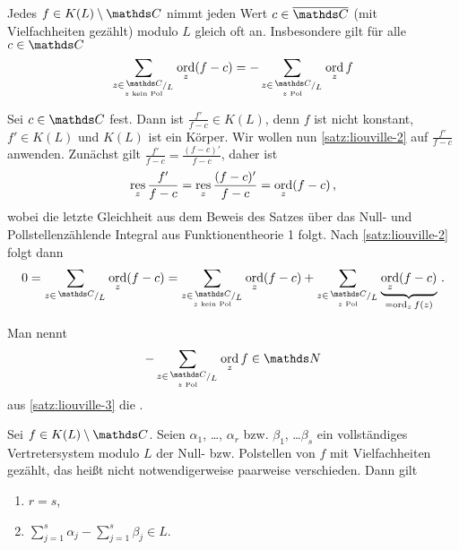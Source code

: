 \begin{satz}\label{satz:liouville-3}
Jedes $f \in K(L)\setminus\CC$ nimmt jeden Wert $c\in\closure\CC$ (mit Vielfachheiten gezählt) modulo $L$ gleich oft an.
Insbesondere gilt für alle $c\in\CC$
\[
	\sum_{\substack{z\in\modulo{\CC}{L}\\ \scriptscriptstyle z \text{ kein Pol}}} \ord_z(f-c)
	= -\sum_{\substack{z\in\modulo{\CC}{L}\\ \scriptscriptstyle z \text{ Pol}}} \ord_z f
\]
\end{satz}

\begin{bewe}
Sei $c\in\CC$ fest.
Dann ist $\frac{f'}{f-c} \in K(L)$, denn $f$ ist nicht konstant, $f'\in K(L)$ und $K(L)$ ist ein Körper.
Wir wollen nun \autoref{satz:liouville-2} auf $\frac{f'}{f-c}$ anwenden.
Zunächst gilt $\frac{f'}{f-c} = \frac{(f-c)'}{f-c}$, daher ist
\[
	\operatorname*{res}_z \frac{f'}{f-c}
	= \operatorname*{res}_z \frac{(f-c)'}{f-c}
	= \operatorname*{ord}_z (f-c)
	\,,
\]
wobei die letzte Gleichheit aus dem Beweis des Satzes über das Null- und Pollstellenzählende Integral aus Funktionentheorie 1 folgt.
Nach \autoref{satz:liouville-2} folgt dann
\[
	0
	= \sum_{z\in\modulo{\CC}{L}} \ord_z (f-c)
	= \sum_{\substack{z\in\modulo{\CC}{L}\\ \scriptscriptstyle z \text{ kein Pol}}} \ord_z (f-c)
	+ \sum_{\substack{z\in\modulo{\CC}{L}\\ \scriptscriptstyle z \text{ Pol}}} \underbrace{\ord_z (f-c)}_{=\ord_z f(z)}
	\,.
\]
\end{bewe}

\begin{defi}
Man nennt
\[
	-\sum_{\substack{z\in\modulo{\CC}{L}\\ \scriptscriptstyle z \text{ Pol}}} \ord_z f \in \NN
\]
aus \autoref{satz:liouville-3} die .
\end{defi}

\begin{satz}\label{satz:liouville-4}
Sei $f\in K(L)\setminus\CC$.
Seien $\alpha_1$, \ldots, $\alpha_r$ bzw. $\beta_1$, \ldots $\beta_s$ ein vollständiges Vertretersystem modulo $L$ der Null- bzw. Polstellen von $f$ mit Vielfachheiten gezählt, das heißt nicht notwendigerweise paarweise verschieden.
Dann gilt
\begin{enumerate}
\item $r = s$,
\item $\sum_{j=1}^s \alpha_j - \sum_{j=1}^s \beta_j \in L$.
\end{enumerate}
\end{satz}


